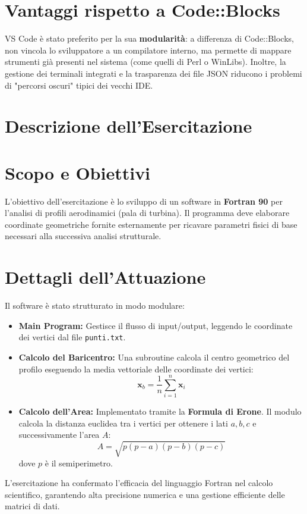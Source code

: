 \section{Vantaggi rispetto a Code::Blocks}
VS Code è stato preferito per la sua \textbf{modularità}: a differenza di Code::Blocks, non vincola lo sviluppatore a un compilatore interno, ma permette di mappare strumenti già presenti nel sistema (come quelli di Perl o WinLibs). Inoltre, la gestione dei terminali integrati e la trasparenza dei file JSON riducono i problemi di "percorsi oscuri" tipici dei vecchi IDE.

\section{Descrizione dell'Esercitazione}

\section{Scopo e Obiettivi}
L'obiettivo dell'esercitazione è lo sviluppo di un software in \textbf{Fortran 90} per l'analisi di profili aerodinamici (pala di turbina). Il programma deve elaborare coordinate geometriche fornite esternamente per ricavare parametri fisici di base necessari alla successiva analisi strutturale.

\section{Dettagli dell'Attuazione}
Il software è stato strutturato in modo modulare:
\begin{itemize}
    \item \textbf{Main Program:} Gestisce il flusso di input/output, leggendo le coordinate dei vertici dal file \texttt{punti.txt}.
    \item \textbf{Calcolo del Baricentro:} Una subroutine calcola il centro geometrico del profilo eseguendo la media vettoriale delle coordinate dei vertici: 
    \[ \mathbf{x}_b = \frac{1}{n} \sum_{i=1}^{n} \mathbf{x}_i \]
    \item \textbf{Calcolo dell'Area:} Implementato tramite la \textbf{Formula di Erone}. Il modulo calcola la distanza euclidea tra i vertici per ottenere i lati $a, b, c$ e successivamente l'area $A$:
    \[ A = \sqrt{p(p-a)(p-b)(p-c)} \]
    dove $p$ è il semiperimetro.
\end{itemize}

L'esercitazione ha confermato l'efficacia del linguaggio Fortran nel calcolo scientifico, garantendo alta precisione numerica e una gestione efficiente delle matrici di dati.